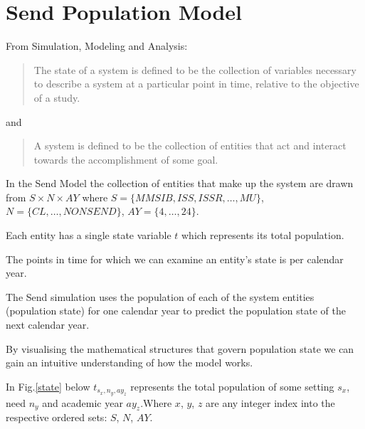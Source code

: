 \documentclass[margin=5mm]{article}
\begin{document}
\section{Send Population Model}

From Simulation, Modeling and Analysis:

\begin{quote}
The state of a system is defined to be the collection of variables
necessary to describe a system at a particular point in time, relative
to the objective of a study.
\end{quote}

and

\begin{quote}
A system is defined to be the collection of entities that act and
interact towards the accomplishment of some goal.
\end{quote}

In the Send Model the collection of entities that make up the system
are drawn from $S \times N \times AY$ where $S = \{MMSIB, ISS, ISSR, \dots, MU\}$,
$N = \{CL, \dots, NONSEND\}$, $AY = \{4, \dots, 24\}$.

Each entity has a single state variable $t$ which represents its total
population.

The points in time for which we can examine an entity's state is per
calendar year.

The Send simulation uses the population of each of the system 
entities (population state) for one calendar year to predict the
population state of the next calendar year.

By visualising the mathematical structures that govern population
state we can gain an intuitive understanding of how the model works.

In Fig.\ref{state} below $t_{s_x,n_y,ay_z}$ represents the total
population of some setting $s_x$, need $n_y$ and academic year
$ay_z$.Where $x$, $y$, $z$ are any integer index into the respective
ordered sets: $S$, $N$, $AY$.
\end{document}
